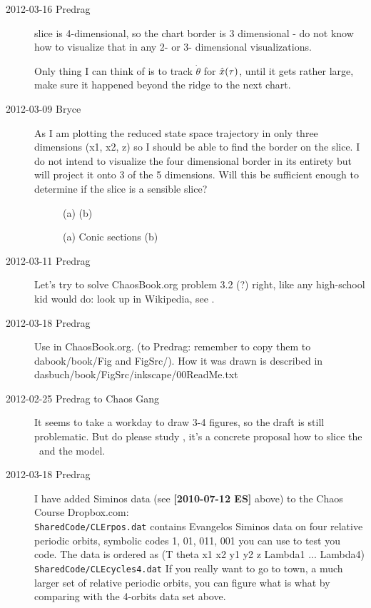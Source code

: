 \begin{description}
\item[2012-03-16 Predrag]
slice is 4-dimensional, so the chart border is 3 dimensional - do not
know how to visualize that in any 2- or 3- dimensional visualizations.

Only thing I can think of is to track $\dot{\theta}$ for $\hat{x}(\tau)$,
until it gets rather large, make sure it happened beyond the ridge to the
next chart.

\item[2012-03-09 Bryce]
As I am plotting the reduced state space trajectory in only three
dimensions (x1, x2, z) so I should be able to find the border on the
slice. I do not intend to visualize the four dimensional border in its
entirety but will project it onto 3 of the 5 dimensions. Will this be
sufficient enough to determine if the slice is a sensible slice?

%
\begin{figure}\label{f:ConicplaneSects}
\centering
(a) %
(b) %
\caption{
(a) Conic sections (b)
}
\end{figure}

\item[2012-03-11 Predrag]
Let's try to solve ChaosBook.org problem 3.2 (?) right, like any
high-school kid would do: look up
 in
Wikipedia, see .

\item[2012-03-18 Predrag]               \toCB
Use  in ChaosBook.org. (to Predrag: remember to
copy them to dabook/book/Fig and FigSrc/). How it was drawn is described
in dasbuch/book/FigSrc/inkscape/00ReadMe.txt


\item[2012-02-25 Predrag to Chaos Gang]
It seems to take a workday to draw 3-4 figures, so the draft is still
problematic. But do please study , it's a
concrete proposal how to slice the \cLf\ and the {\twoMode} model.

\item[2012-03-18 Predrag] I have added Siminos data (see {\bf [2010-07-12
ES]} above) to the Chaos Course Dropbox.com:
\\
          \texttt{SharedCode/CLErpos.dat}
            contains Evangelos Siminos data on four relative periodic
            orbits, symbolic codes 1, 01, 011, 001 you can use to test
            you code. The data is ordered as
            (T theta x1 x2 y1 y2 z Lambda1 ... Lambda4)
\\
          \texttt{SharedCode/CLEcycles4.dat}
            If you really want to go to town, a much larger set of
            relative periodic orbits, you can figure what is what by
            comparing with the 4-orbits data set above.


\end{description}
